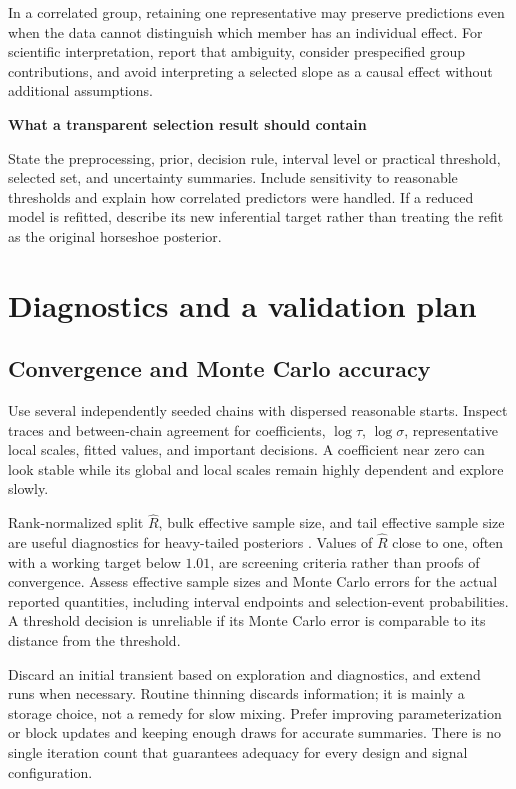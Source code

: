 \documentclass[11pt,letterpaper]{article}
\numberwithin{equation}{section}
\newcommand{\key}[1]{\par\smallskip\textbf{#1}\par\smallskip}
\begin{document}
In a correlated group, retaining one representative may preserve predictions
even when the data cannot distinguish which member has an individual effect.
For scientific interpretation, report that ambiguity, consider prespecified
group contributions, and avoid interpreting a selected slope as a causal
effect without additional assumptions.

\key{What a transparent selection result should contain}
State the preprocessing, prior, decision rule, interval level or practical
threshold, selected set, and uncertainty summaries. Include sensitivity to
reasonable thresholds and explain how correlated predictors were handled.
If a reduced model is refitted, describe its new inferential target rather
than treating the refit as the original horseshoe posterior.

\section{Diagnostics and a validation plan}\label{sec:diagnostics}

\subsection{Convergence and Monte Carlo accuracy}

Use several independently seeded chains with dispersed reasonable starts.
Inspect traces and between-chain agreement for coefficients, \(\log\tau\),
\(\log\sigma\), representative local scales, fitted values, and important
decisions. A coefficient near zero can look stable while its global and
local scales remain highly dependent and explore slowly.

Rank-normalized split \(\widehat R\), bulk effective sample size, and tail
effective sample size are useful diagnostics for heavy-tailed posteriors
\cite{vehtari2021}. Values of \(\widehat R\) close to one, often with a
working target below \(1.01\), are screening criteria rather than proofs of
convergence. Assess effective sample sizes and Monte Carlo errors for the
actual reported quantities, including interval endpoints and selection-event
probabilities. A threshold decision is unreliable if its Monte Carlo error
is comparable to its distance from the threshold.

Discard an initial transient based on exploration and diagnostics, and
extend runs when necessary. Routine thinning discards information; it is
mainly a storage choice, not a remedy for slow mixing. Prefer improving
parameterization or block updates and keeping enough draws for accurate
summaries. There is no single iteration count that guarantees adequacy for
every design and signal configuration.
\end{document}
